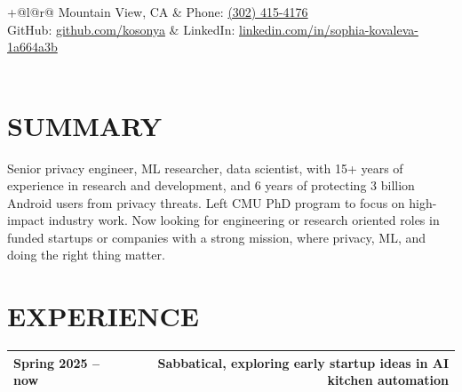 \documentclass{res}
\makeatletter
\newcommand{\ExperienceHeader}[3]{%
  \Needspace{9\baselineskip}%
  \par\vspace{0.35ex}%
  \noindent
  \begin{tabular*}{\textwidth}{@{}l@{\extracolsep{\fill}}c@{\extracolsep{\fill}}r@{}}
    #1 & \textbf{#2} & #3 \\[-0.2ex]
    \hline
  \end{tabular*}%
  \par\nopagebreak[4]\vspace{0.35ex}\nopagebreak[4]%
}
\makeatother
\begin{document}
 
\begin{resume}
\vspace{-20pt}%

\noindent\hspace{-\sectionwidth}%
{\large
\begin{tabular*}{\dimexpr\textwidth+\sectionwidth\relax}{@{}l@{\extracolsep{\fill}}r@{}}
	Mountain View, CA & Phone: \href{tel:+13024154176}{(302) 415-4176} \\
	GitHub: \href{https://github.com/kosonya/}{github.com/kosonya} &
	LinkedIn: \href{https://www.linkedin.com/in/sophia-kovaleva-1a664a3b/}{linkedin.com/in/sophia-kovaleva-1a664a3b} \\
	 \\
\end{tabular*}%
}%

\section{SUMMARY}

Senior privacy engineer, ML researcher, data scientist, with 15+ years of experience in research and development, and 6 years of protecting 3 billion Android users from privacy threats. Left CMU PhD program to focus on high-impact industry work. Now looking for engineering or research oriented roles in funded startups or companies with a strong mission, where privacy, ML, and doing the right thing matter.

\section{EXPERIENCE}

\ExperienceHeader{Spring 2025 -- now}{}{Sabbatical, exploring early startup ideas in AI kitchen automation}


\end{resume}
\end{document}

